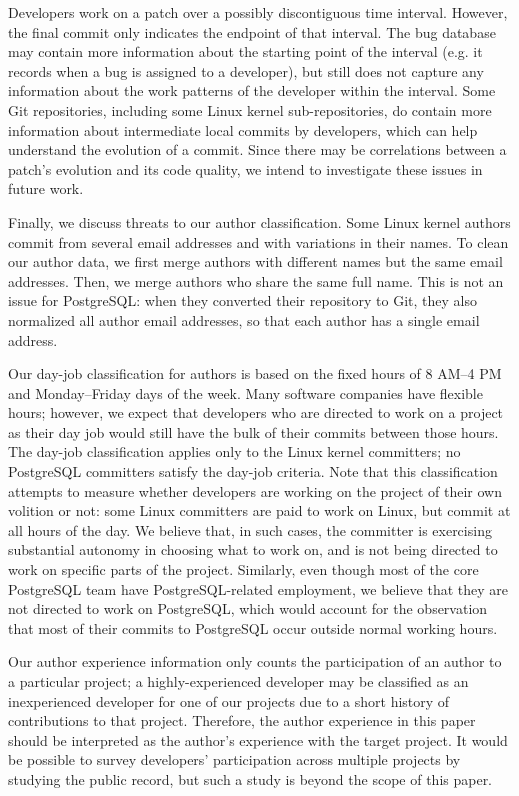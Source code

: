 Developers work on a patch over a possibly discontiguous time interval. However,
the final commit only indicates the endpoint of that interval. The bug database
may contain more information about the starting point of the interval (e.g. it
records when a bug is assigned to a developer), but still does not capture any
information about the work patterns of the developer within the interval. Some
Git repositories, including some Linux kernel sub-repositories, do contain more
information about intermediate local commits by developers, which can help
understand the evolution of a commit. Since there may be correlations between a
patch's evolution and its code quality, we intend to investigate these issues in
future work.

Finally, we discuss threats to our author classification. Some Linux
kernel authors commit from several email addresses and with variations
in their names. To clean our author data, we first merge authors with
different names but the same email addresses. Then, we merge authors
who share the same full name. This is not an issue for PostgreSQL:
when they converted their repository to Git, they also normalized all
author email addresses, so that each author has a single email
address.

Our day-job classification for authors is based on the fixed hours of
8 AM--4 PM and Monday--Friday days of the week. Many software companies
have flexible hours; however, we expect that developers who are
directed to work on a project as their day job would still have the
bulk of their commits between those hours. The day-job classification
applies only to the Linux kernel committers; no PostgreSQL committers
satisfy the day-job criteria. Note that this classification attempts
to measure whether developers are working on the project of their own
volition or not: some Linux committers 
are paid to work on Linux, but commit at all hours of the day. 
We believe that, in
such cases, the committer is exercising substantial autonomy in
choosing what to work on, and is not being directed to work on
specific parts of the project. Similarly, even though most of the
core PostgreSQL team have PostgreSQL-related employment, we believe
that they are not directed to work on PostgreSQL, which would account
for the observation that most of their commits to PostgreSQL occur
outside normal working hours.

Our author experience information only counts the participation of an author to
a particular project; a highly-experienced developer may be classified as an
inexperienced developer for one of our projects due to a short history of
contributions to that project. %
Therefore, the author experience in this paper should be interpreted as the 
author's experience with the target project. 
It would be possible to
survey developers' participation across multiple projects by studying the public
record, but such a study is beyond the scope of this paper.
